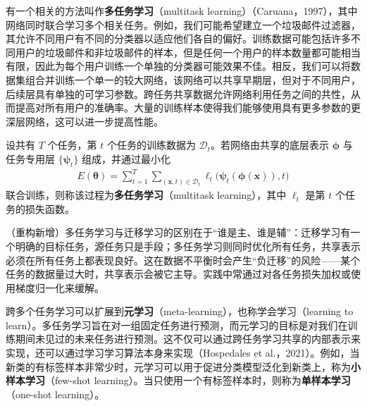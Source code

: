 \documentclass[../../main.tex]{subfiles}
\begin{document}
有一个相关的方法叫作\textbf{多任务学习}（multitask learning）（Caruana，1997），其中网络同时联合学习多个相关任务。例如，我们可能希望建立一个垃圾邮件过滤器，其允许不同用户有不同的分类器以适应他们各自的偏好。训练数据可能包括许多不同用户的垃圾邮件和非垃圾邮件的样本，但是任何一个用户的样本数量都可能相当有限，因此为每个用户训练一个单独的分类器可能效果不佳。相反，我们可以将数据集组合并训练一个单一的较大网络，该网络可以共享早期层，但对于不同用户，后续层具有单独的可学习参数。跨任务共享数据允许网络利用任务之间的共性，从而提高对所有用户的准确率。大量的训练样本使得我们能够使用具有更多参数的更深层网络，这可以进一步提高性能。

\begin{definition}[多任务学习]\label{definition:ch06-多任务学习}
设共有 $T$ 个任务，第 $t$ 个任务的训练数据为 $\mathcal{D}_t$。若网络由共享的底层表示 $\boldsymbol{\phi}$ 与任务专用层 $\{\boldsymbol{\psi}_t\}$ 组成，并通过最小化
\begin{align}
E(\boldsymbol{\theta})=\sum_{t=1}^{T}\sum_{(\boldsymbol{x},t)\in\mathcal{D}_t}\ell_t\bigl(\boldsymbol{\psi}_t(\boldsymbol{\phi}(\boldsymbol{x})),t\bigr)
\label{align:ch06-多任务目标}
\end{align}
联合训练，则称该过程为\textbf{多任务学习}（multitask learning），其中 $\ell_t$ 是第 $t$ 个任务的损失函数。
\end{definition}

\begin{remark}（重构新增）多任务学习与迁移学习的区别在于“谁是主、谁是辅”：迁移学习有一个明确的目标任务，源任务只是手段；多任务学习则同时优化所有任务，共享表示必须在所有任务上都表现良好。这在数据不平衡时会产生“负迁移”的风险——某个任务的数据量过大时，共享表示会被它主导。实践中常通过对各任务损失加权或使用梯度归一化来缓解。
\end{remark}

跨多个任务学习可以扩展到\textbf{元学习}（meta-learning），也称学会学习（learning to learn）。多任务学习旨在对一组固定任务进行预测，而元学习的目标是对我们在训练期间未见过的未来任务进行预测。这不仅可以通过跨任务学习共享的内部表示来实现，还可以通过学习学习算法本身来实现（Hospedales et al.，2021）。例如，当新类的有标签样本非常少时，元学习可以用于促进分类模型泛化到新类上，称为\textbf{小样本学习}（few-shot learning）。当只使用一个有标签样本时，则称为\textbf{单样本学习}（one-shot learning）。
\end{document}
